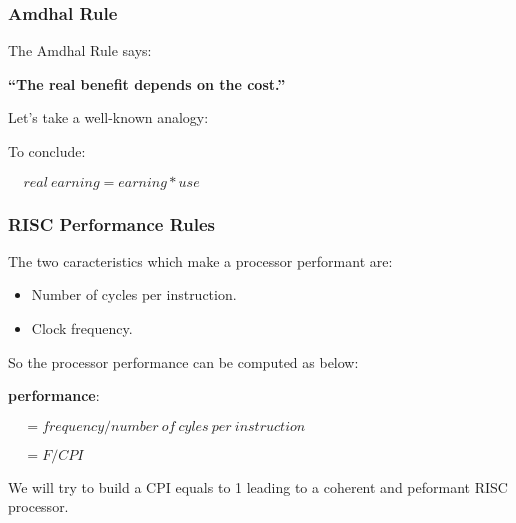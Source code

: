 
\begin{frame}
  \frametitle{Amdhal Rule}

  The Amdhal Rule says:

  \nl

  \textbf{``The real benefit depends on the cost.''}

  \nl

  Let's take a well-known analogy:

  \begin{center}
  \end{center}

  To conclude:

  \nl

  $~~~~~real~earning = earning * use$
\end{frame}


\begin{frame}
  \frametitle{RISC Performance Rules}

  The two caracteristics which make a processor performant are:

  \begin{itemize}
    \item
      Number of cycles per instruction.
    \item
      Clock frequency.
  \end{itemize}

  So the processor performance can be computed as below:

  \nl

  \textbf{performance}:

  $~~~~~= frequency / number~of~cyles~per~instruction$

  $~~~~~= F / CPI$

  \nl

  We will try to build a CPI equals to 1 leading to a coherent and peformant
  RISC processor.
\end{frame}


